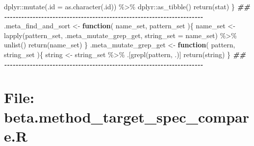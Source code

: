 \documentclass[
]{article}
\newenvironment{Shaded}{\begin{snugshade}}{\end{snugshade}}
\newcommand{\AttributeTok}[1]{\textcolor[rgb]{0.77,0.63,0.00}{#1}}
\newcommand{\ControlFlowTok}[1]{\textcolor[rgb]{0.13,0.29,0.53}{\textbf{#1}}}
\newcommand{\DocumentationTok}[1]{\textcolor[rgb]{0.56,0.35,0.01}{\textbf{\textit{#1}}}}
\newcommand{\FunctionTok}[1]{\textcolor[rgb]{0.00,0.00,0.00}{#1}}
\newcommand{\NormalTok}[1]{#1}
\newcommand{\OtherTok}[1]{\textcolor[rgb]{0.56,0.35,0.01}{#1}}
\newcommand{\SpecialCharTok}[1]{\textcolor[rgb]{0.00,0.00,0.00}{#1}}
\begin{document}
\begin{Shaded}
\begin{Highlighting}[]
\NormalTok{      dplyr}\SpecialCharTok{::}\FunctionTok{mutate}\NormalTok{(}\AttributeTok{.id =} \FunctionTok{as.character}\NormalTok{(.id)) }\SpecialCharTok{\%\textgreater{}\%} 
\NormalTok{      dplyr}\SpecialCharTok{::}\FunctionTok{as\_tibble}\NormalTok{() }
    \FunctionTok{return}\NormalTok{(stat)}
\NormalTok{  \}}
\DocumentationTok{\#\# {-}{-}{-}{-}{-}{-}{-}{-}{-}{-}{-}{-}{-}{-}{-}{-}{-}{-}{-}{-}{-}{-}{-}{-}{-}{-}{-}{-}{-}{-}{-}{-}{-}{-}{-}{-}{-}{-}{-}{-}{-}{-}{-}{-}{-}{-}{-}{-}{-}{-}{-}{-}{-}{-}{-}{-}{-}{-}{-}{-}{-}{-}{-}{-}{-}{-}{-}{-}{-}{-} }
\NormalTok{.meta\_find\_and\_sort }\OtherTok{\textless{}{-}}
  \ControlFlowTok{function}\NormalTok{(}
\NormalTok{           name\_set,}
\NormalTok{           pattern\_set}
\NormalTok{           )\{}
\NormalTok{    name\_set }\OtherTok{\textless{}{-}} \FunctionTok{lapply}\NormalTok{(pattern\_set, .meta\_mutate\_grep\_get,}
                       \AttributeTok{string\_set =}\NormalTok{ name\_set) }\SpecialCharTok{\%\textgreater{}\%}
      \FunctionTok{unlist}\NormalTok{()}
    \FunctionTok{return}\NormalTok{(name\_set)}
\NormalTok{  \}}
\NormalTok{.meta\_mutate\_grep\_get }\OtherTok{\textless{}{-}}
  \ControlFlowTok{function}\NormalTok{(}
\NormalTok{           pattern,}
\NormalTok{           string\_set}
\NormalTok{           )\{}
\NormalTok{    string }\OtherTok{\textless{}{-}}\NormalTok{ string\_set }\SpecialCharTok{\%\textgreater{}\%}
\NormalTok{      .[}\FunctionTok{grepl}\NormalTok{(pattern, .)]}
    \FunctionTok{return}\NormalTok{(string)}
\NormalTok{  \}}
\DocumentationTok{\#\# {-}{-}{-}{-}{-}{-}{-}{-}{-}{-}{-}{-}{-}{-}{-}{-}{-}{-}{-}{-}{-}{-}{-}{-}{-}{-}{-}{-}{-}{-}{-}{-}{-}{-}{-}{-}{-}{-}{-}{-}{-}{-}{-}{-}{-}{-}{-}{-}{-}{-}{-}{-}{-}{-}{-}{-}{-}{-}{-}{-}{-}{-}{-}{-}{-}{-}{-}{-}{-}{-} }
\end{Highlighting}
\end{Shaded}

\hypertarget{file-beta.method_target_spec_compare.r}{%
\section{File: beta.method\_target\_spec\_compare.R}\label{file-beta.method_target_spec_compare.r}}
\end{document}
